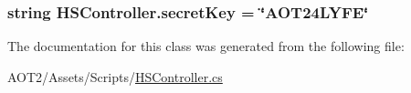 \subsubsection[{secret\+Key}]{\setlength{\rightskip}{0pt plus 5cm}string H\+S\+Controller.\+secret\+Key = \char`\"{}A\+O\+T24\+L\+Y\+F\+E\char`\"{}\hspace{0.3cm}{\ttfamily [private]}}\label{class_h_s_controller_ac0db055fde969bb2c85a406323d3aea2}


The documentation for this class was generated from the following file\+:\begin{DoxyCompactItemize}
\item 
A\+O\+T2/\+Assets/\+Scripts/\hyperlink{_h_s_controller_8cs}{H\+S\+Controller.\+cs}\end{DoxyCompactItemize}
